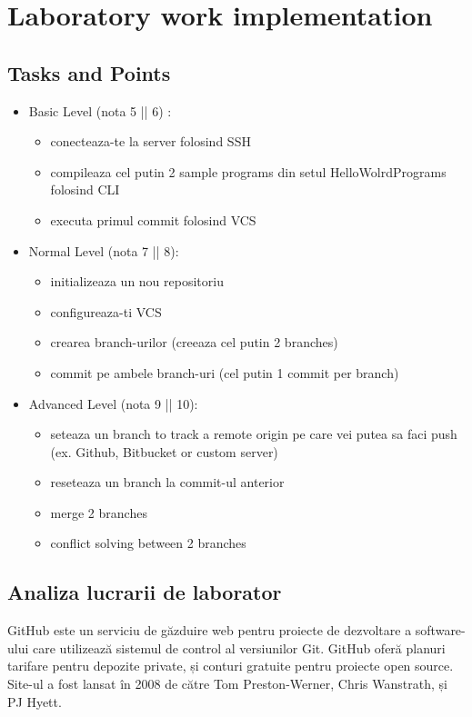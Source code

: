 \section{Laboratory work implementation}

\subsection{Tasks and Points}

\begin{itemize}
	\item Basic Level (nota 5 || 6) :
	\begin{itemize}
		\item conecteaza-te la server folosind SSH
		\item compileaza cel putin 2 sample programs din setul HelloWolrdPrograms folosind CLI
		\item executa primul commit folosind VCS
	\end{itemize}
	\item Normal Level (nota 7 || 8):
	\begin{itemize}
		\item initializeaza un nou repositoriu
		\item configureaza-ti VCS
		\item crearea branch-urilor (creeaza cel putin 2 branches)
		\item commit pe ambele branch-uri (cel putin 1 commit per branch)
	\end{itemize}
	\item Advanced Level (nota 9 || 10):
	\begin{itemize}
		\item seteaza un branch to track a remote origin pe care vei putea sa faci push (ex. Github, Bitbucket or custom server)
		\item reseteaza un branch la commit-ul anterior
		\item merge 2 branches
	\item conflict solving between 2 branches
	\end{itemize}
	\end{itemize}

\subsection{Analiza lucrarii de laborator}
GitHub este un serviciu de găzduire web pentru proiecte de dezvoltare a software-ului care utilizează sistemul de control al versiunilor Git. GitHub oferă planuri tarifare pentru depozite private, și conturi gratuite pentru proiecte open source. Site-ul a fost lansat în 2008 de către Tom Preston-Werner, Chris Wanstrath, și PJ Hyett.

